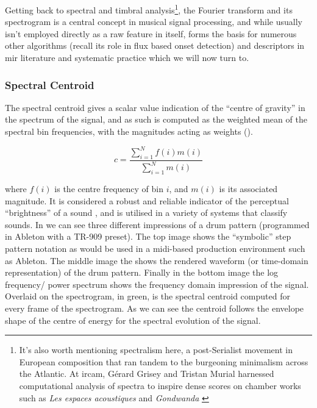 {{Getting back to spectral and timbral analysis\footnote{It's also worth mentioning spectralism here, a post-Serialist movement in European composition that ran tandem to the burgeoning minimalism across the Atlantic. At \acrshort{ircam}, Gérard Grisey and Tristan Murial harnessed computational analysis of spectra to inspire dense scores on chamber works such as \textit{Les espaces acoustiques} and \textit{Gondwanda} \citep{ross2007rest, Harvey2000}}, the Fourier transform and its spectrogram is a central concept in musical signal processing, and while usually isn't employed directly as a raw feature in itself, forms the basis for numerous other algorithms (recall its role in flux based onset detection) and descriptors in \acrshort{mir} literature and systematic practice which we will now turn to. 

\subsubsection{Spectral Centroid}

The spectral centroid gives a scalar value indication of the ``centre of gravity'' in the spectrum of the signal, and as such is computed as the weighted mean of the spectral bin frequencies, with the magnitudes acting as weights ().

\begin{equation}
\label{eq:centroid}	
c = \frac{\sum_{i=1}^{N}f(i)m(i)}{\sum_{i=1}^{N}m(i)}
\end{equation}

where $f(i)$ is the centre frequency of bin $i$, and $m(i)$ is its associated magnitude. It is considered a robust and reliable indicator of the perceptual ``brightness'' of a sound \citep{Schubert2004}, and is utilised in a variety of systems that classify sounds. In  we can see three different impressions of a drum pattern (programmed in Ableton with a TR-909 preset). The top image shows the ``symbolic'' step pattern notation as would be used in a \acrshort{midi}-based production environment such as Ableton. The middle image the shows the rendered waveform (or time-domain representation) of the drum pattern. Finally in the bottom image the log frequency/ power spectrum shows the frequency domain impression of the signal. Overlaid on the spectrogram, in green, is the spectral centroid computed for every frame of the spectrogram. As we can see the centroid follows the envelope shape of the centre of energy for the spectral evolution of the signal.

}}

